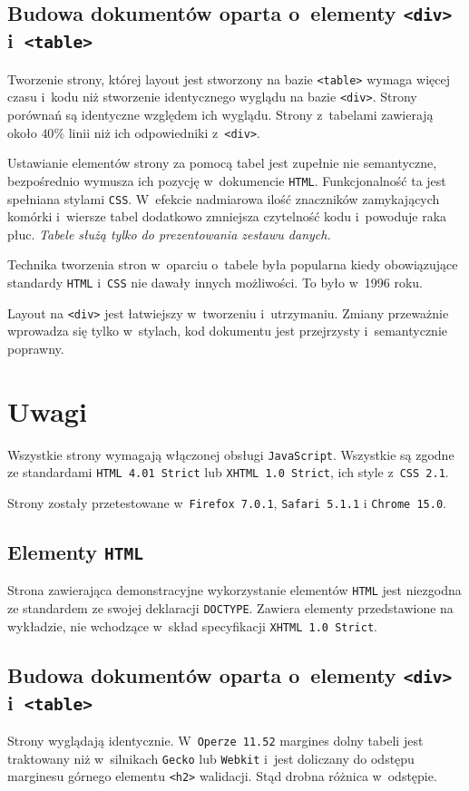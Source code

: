 \documentclass[10pt,a4paper]{article}
\newcommand{\f}[1]{\texttt{#1}}
\begin{document}
\subsection{Budowa dokumentów oparta o~elementy \f{<div>} i~\f{<table>}}
Tworzenie strony, której layout jest stworzony na bazie \f{<table>} wymaga
więcej czasu i~kodu niż stworzenie identycznego wyglądu na bazie \f{<div>}.
Strony porównań są identyczne względem ich wyglądu. Strony z~tabelami zawierają
około $40\%$ linii niż ich odpowiedniki z~\f{<div>}.

Ustawianie elementów strony za pomocą tabel jest zupełnie nie semantyczne,
bezpośrednio wymusza ich pozycję w~dokumencie \f{HTML}. Funkcjonalność ta jest
spełniana stylami \f{CSS}. W~efekcie nadmiarowa ilość znaczników zamykających
komórki i~wiersze tabel dodatkowo zmniejsza czytelność kodu i~powoduje raka
płuc. \emph{Tabele służą tylko do prezentowania zestawu danych.}

Technika tworzenia stron w~oparciu o~tabele była popularna kiedy obowiązujące
standardy \f{HTML} i~\f{CSS} nie dawały innych możliwości. To było w~1996 roku.

Layout na \f{<div>} jest łatwiejszy w~tworzeniu i~utrzymaniu. Zmiany przeważnie
wprowadza się tylko w~stylach, kod dokumentu jest przejrzysty i~semantycznie
poprawny.



\section{Uwagi}
Wszystkie strony wymagają włączonej obsługi \f{JavaScript}. Wszystkie są zgodne
ze standardami \f{HTML~4.01~Strict} lub \f{XHTML~1.0~Strict}, ich style
z~\f{CSS~2.1}.

Strony zostały przetestowane w~\f{Firefox 7.0.1}, \f{Safari 5.1.1} i \f{Chrome
15.0}.

\subsection{Elementy \f{HTML}}
Strona zawierająca demonstracyjne wykorzystanie elementów \f{HTML} jest
niezgodna ze standardem ze swojej deklaracji \f{DOCTYPE}. Zawiera elementy
przedstawione na wykładzie, nie wchodzące w~skład specyfikacji \f{XHTML 1.0
Strict}.

\subsection{Budowa dokumentów oparta o~elementy \f{<div>} i~\f{<table>}}
\label{sec:uwagi_budowa}
Strony wyglądają identycznie. W~\f{Operze 11.52} margines dolny tabeli jest
traktowany niż w~silnikach \f{Gecko} lub \f{Webkit} i~jest doliczany do odstępu
marginesu górnego elementu \f{<h2>} walidacji. Stąd drobna różnica w~odstępie.
\end{document}
